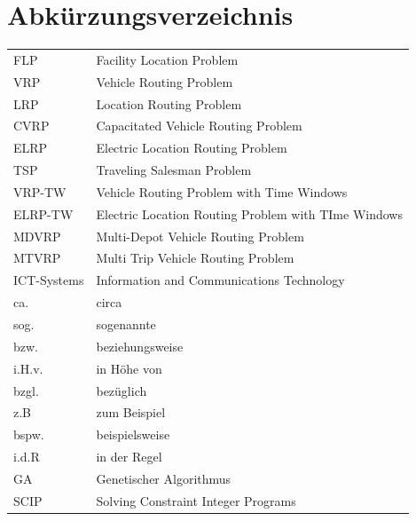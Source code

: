 \documentclass[a4paper,12pt,parskip,bibtotoc,liststotoc]{article}
\begin{document}
\section*{Abkürzungsverzeichnis}
\begin{table}[h!]
    \vspace*{-3mm}
    \hspace*{2mm}
  \renewcommand{\arraystretch}{1,5}
    \begin{tabular}{ll}  %
FLP & Facility Location Problem\\

VRP &  Vehicle Routing Problem\\

LRP & Location Routing Problem\\

CVRP & Capacitated Vehicle Routing Problem\\

ELRP & Electric Location Routing Problem\\

TSP & Traveling Salesman Problem\\

VRP-TW & Vehicle Routing Problem with Time Windows\\

ELRP-TW & Electric Location Routing Problem with TIme Windows\\

MDVRP & Multi-Depot Vehicle Routing Problem\\

MTVRP & Multi Trip Vehicle Routing Problem \\

ICT-Systems & Information and Communications Technology\\

ca. & circa\\

sog. & sogenannte \\

bzw. & beziehungsweise \\

i.H.v. & in Höhe von\\

bzgl. & bezüglich\\

z.B & zum Beispiel\\

bspw. & beispielsweise\\ 
 
i.d.R & in der Regel \\

GA & Genetischer Algorithmus\\

SCIP & Solving Constraint Integer Programs\\

	\end{tabular}
\end{table}
\end{document}
